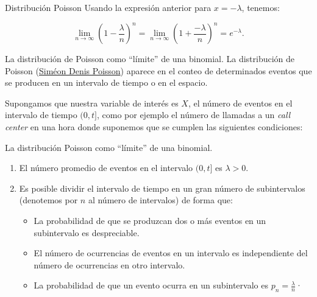 \documentclass[
  ignorenonframetext,
  aspectratio=169]{beamer}
\providecommand{\tightlist}{%
  \setlength{\itemsep}{0pt}\setlength{\parskip}{0pt}}\usepackage{longtable,booktabs,array}
\begin{document}
\begin{frame}{Distribución Poisson}
\protect\hypertarget{distribuciuxf3n-poisson-2}{}
Usando la expresión anterior para \(x=-\lambda\), tenemos:

\[
\lim_{n\to\infty} \left(1-\frac{\lambda}{n}\right)^n=\lim_{n\to\infty} \left(1+\frac{-\lambda}{n}\right)^n=e^{-\lambda}.
\]
\end{frame}

\begin{frame}{La distribución de Poisson como ``límite'' de una
binomial.}
\protect\hypertarget{la-distribuciuxf3n-de-poisson-como-luxedmite-de-una-binomial.}{}
La distribución de Poisson
(\href{https://es.wikipedia.org/wiki/Sim\%C3\%A9on_Denis_Poisson}{Siméon
Denis Poisson}) aparece en el conteo de determinados eventos que se
producen en un intervalo de tiempo o en el espacio.

Supongamos que nuestra variable de interés es \(X\), el número de
eventos en el intervalo de tiempo \((0,t]\), como por ejemplo el número
de llamadas a un \emph{call center} en una hora donde suponemos que se
cumplen las siguientes condiciones:
\end{frame}

\begin{frame}{La distribución Poisson como ``límite'' de una binomial.}
\protect\hypertarget{la-distribuciuxf3n-poisson-como-luxedmite-de-una-binomial.}{}
\begin{enumerate}
\tightlist
\item
  El número promedio de eventos en el intervalo \((0,t]\) es
  \(\lambda>0\).
\item
  Es posible dividir el intervalo de tiempo en un gran número de
  subintervalos (denotemos por \(n\) al número de intervalos) de forma
  que:

  \begin{itemize}
  \tightlist
  \item
    La probabilidad de que se produzcan dos o más eventos en un
    subintervalo es despreciable.
  \item
    El número de ocurrencias de eventos en un intervalo es independiente
    del número de ocurrencias en otro intervalo.
  \item
    La probabilidad de que un evento ocurra en un subintervalo es
    \(p_n=\frac{\lambda}{n}\)·
  \end{itemize}
\end{enumerate}
\end{frame}
\end{document}
